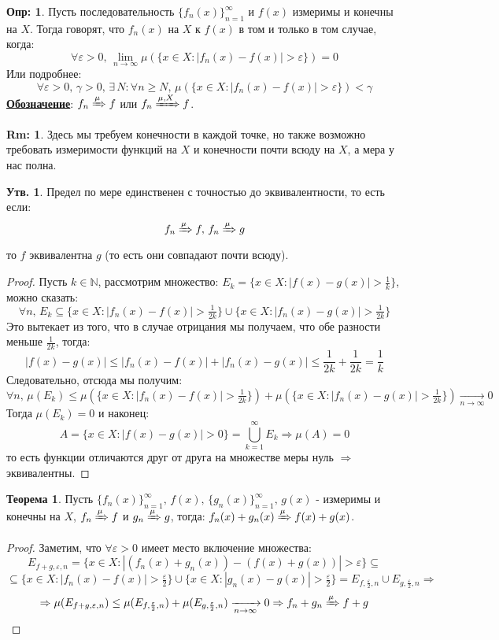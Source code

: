 \documentclass[12pt]{article}
\newcommand{\MN}{\mathbb{N}}
\newcommand{\VE}{\varepsilon}
\theoremstyle{definition}
\newtheorem{defn}{Опр:}
\newtheorem{rem}{Rm:}
\newtheorem{prop}{Утв.}
\newtheorem{theorem}{Теорема}
\begin{document}
\begin{defn}
	Пусть последовательность $\{f_n(x)\}_{n = 1}^{\infty}$ и $f(x)$ измеримы и конечны на $X$. Тогда говорят, что $f_n(x)$  на $X$ к $f(x)$ в том и только в том случае, когда:
	$$
		\forall \VE > 0, \, \lim\limits_{n \to \infty}\mu(\{x \in X \colon |f_n(x) - f(x)| > \VE\}) = 0
	$$
	Или подробнее:
	$$
		\forall \VE > 0, \, \gamma > 0, \, \exists \, N \colon \forall n \geq N, \, \mu(\{x \in X \colon |f_n(x) - f(x)| > \VE\}) < \gamma
	$$
	\textbf{\uline{Обозначение}}: $f_n \xRightarrow{\mu}f$ или $f_n \xRightarrow{\mu, X} f$.
\end{defn}
\begin{rem}
	Здесь мы требуем конечности в каждой точке, но также возможно требовать измеримости функций на $X$ и конечности почти всюду на $X$, а мера у нас полна.
\end{rem}

\begin{prop}
	Предел по мере единственен с точностью до эквивалентности, то есть если:
	$$
		f_n \xRightarrow{\mu} f, \, f_n \xRightarrow{\mu} g
	$$
	то $f$ эквивалентна $g$ (то есть они совпадают почти всюду).
\end{prop}
\begin{proof}
	Пусть $k \in \MN$, рассмотрим множество: $E_k = \{x \in X \colon |f(x) - g(x)| > \tfrac{1}{k}\}$, можно сказать:
	$$
		\forall n, \, E_k \subseteq \{x \in X \colon |f_n(x) - f(x)| > \tfrac{1}{2k}\} \cup \{x \in X \colon |f_n(x) - g(x)| > \tfrac{1}{2k}\}
	$$
	Это вытекает из того, что в случае отрицания мы получаем, что обе разности меньше $\tfrac{1}{2k}$, тогда:
	$$
		|f(x) - g(x)| \leq |f_n(x) - f(x)| + |f_n(x) - g(x)| \leq \dfrac{1}{2k} + \dfrac{1}{2k} = \dfrac{1}{k}
	$$
	Следовательно, отсюда мы получим:
	$$
		\forall n, \, \mu(E_k) \leq \mu(\{x \in X \colon |f_n(x) - f(x)| > \tfrac{1}{2k}\}) + \mu (\{x \in X \colon |f_n(x) - g(x)| > \tfrac{1}{2k}\}) \xrightarrow[n \to \infty]{} 0
	$$
	Тогда $\mu(E_k) = 0$ и наконец:
	$$
		A = \{x \in X \colon |f(x) - g(x)| > 0\} = \bigcup\limits_{k = 1}^{\infty}E_k \Rightarrow \mu(A) = 0
	$$
	то есть функции отличаются друг от друга на множестве меры нуль $\Rightarrow$ эквивалентны.
\end{proof}
\begin{theorem}
	Пусть $\{f_n(x)\}_{n = 1}^{\infty}, \, f(x), \, \{g_n(x)\}_{n = 1}^{\infty}, \, g(x)$ - измеримы и конечны на $X$, $f_n \xRightarrow{\mu}f$ и $g_n \xRightarrow{\mu}g$, тогда: $f_n(x) + g_n(x) \xRightarrow{\mu}f(x) + g(x)$.
\end{theorem}
\begin{proof}
	Заметим, что $\forall \VE > 0$ имеет место включение множества:
	$$
		E_{f + g, \VE,n} = \{x \in X \colon |(f_n(x) + g_n(x)) - (f(x) + g(x))| > \VE\} \subseteq 
	$$
	$$
		\subseteq \{x \in X \colon |f_n(x) -f(x)| > \tfrac{\VE}{2}\} \cup \{x \in X \colon |g_n(x) -g(x)| > \tfrac{\VE}{2}\} = E_{f,\frac{\VE}{2},n} \cup E_{g,\frac{\VE}{2},n} \Rightarrow
	$$
	$$
		\Rightarrow \mu(E_{f + g, \VE,n}) \leq \mu(E_{f,\frac{\VE}{2},n}) + \mu(E_{g,\frac{\VE}{2},n}) \xrightarrow[n \to \infty]{} 0 \Rightarrow f_n + g_n \xRightarrow{\mu} f+ g
	$$
\end{proof}
\end{document}
